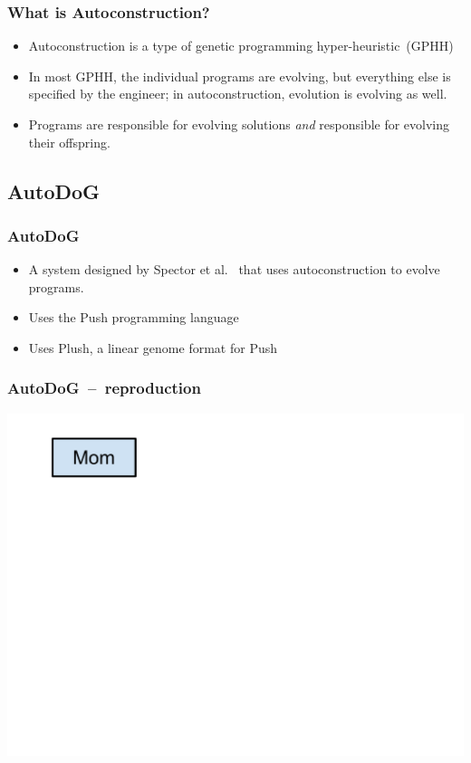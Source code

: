 \documentclass{beamer}
\newcommand{\linespace}{\vskip 0.25cm}
\begin{document}
\begin{frame}
	\frametitle{What is Autoconstruction?}
	\begin{itemize}
		\item Autoconstruction is a type of genetic programming hyper-heuristic~(GPHH)
		\linespace
		\pause
		\item In most GPHH, the individual programs are evolving, but everything else is specified by the engineer; in autoconstruction, evolution is evolving as well.
		\linespace
		\pause
		\item Programs are responsible for evolving solutions \textit{and} responsible for evolving their offspring.
	\end{itemize}
\end{frame}

\subsection{AutoDoG}

\begin{frame}
	\frametitle{AutoDoG}
	\begin{itemize}
		\item A system designed by Spector et al.~\cite{spector:2016} that uses autoconstruction to evolve programs.
		\linespace
		\pause
		\item Uses the Push programming language
		\linespace
		\pause
		\item Uses Plush, a linear genome format for Push
	\end{itemize}	
\end{frame}

\begin{frame}
	\frametitle{AutoDoG~--~reproduction}
	\includegraphics[width=.9\textwidth]{Illustrations/autodog_1.PDF}
\end{frame}
\end{document}
